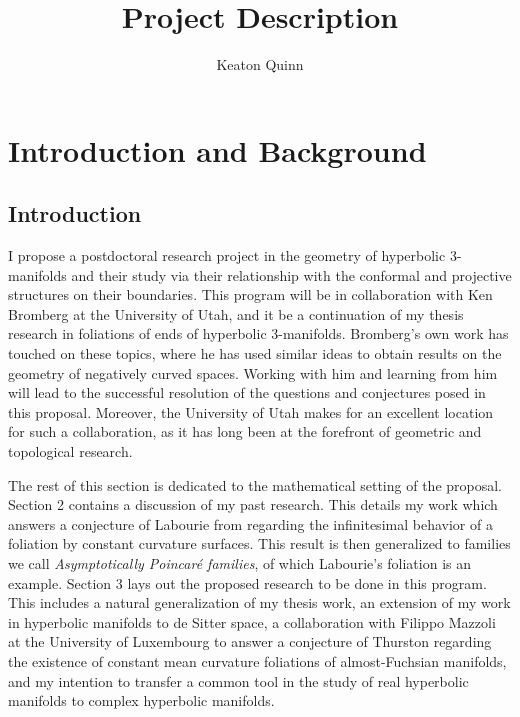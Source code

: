 \documentclass[11pt]{amsart}
\begin{document}
\title{Project Description}

\author{Keaton Quinn}


\maketitle

\vspace{-9mm}
\section{Introduction and Background}
\subsection{Introduction}
I propose a postdoctoral research project in the geometry of hyperbolic 3-manifolds and their study via their relationship with the conformal and projective structures on their boundaries. This program will be in collaboration with Ken Bromberg at the University of Utah, and it be a continuation of my thesis research in foliations of ends of hyperbolic 3-manifolds. Bromberg's own work has touched on these topics, where he has used similar ideas to obtain results on the geometry of negatively curved spaces. Working with him and learning from him will lead to the successful resolution of the questions and conjectures posed in this proposal. Moreover, the University of Utah makes for an excellent location for such a collaboration, as it has long been at the forefront of geometric and topological research.

The rest of this section is dedicated to the mathematical setting of the proposal. Section 2 contains a discussion of my past research. This details my work which answers a conjecture of Labourie from \cite{labourie1992} regarding the infinitesimal behavior of a foliation by constant curvature surfaces. This result is then generalized to families we call \emph{Asymptotically Poincar\'e families}, of which Labourie's foliation is an example. Section 3 lays out the proposed research to be done in this program. This includes a natural generalization of my thesis work, an extension of my work in hyperbolic manifolds to de Sitter space, a collaboration with Filippo Mazzoli at the University of Luxembourg to answer a conjecture of Thurston regarding the existence of constant mean curvature foliations of almost-Fuchsian manifolds, and my intention to transfer a common tool in the study of real hyperbolic manifolds to complex hyperbolic manifolds. 
\end{document}

